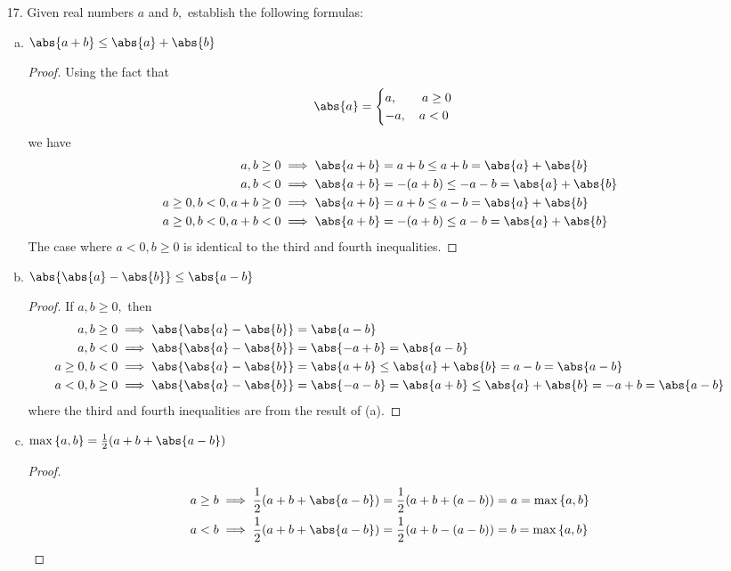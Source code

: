 \documentclass{article}
\begin{document}
\begin{itemize}
	\item[17.] Given real numbers $a$ and $b,$ establish the following formulas:
		\begin{enumerate}[(a)]
			\item $\abs{a+b}\le \abs{a}+\abs{b}$
				\begin{proof}
					Using the fact that
					\begin{align*}
						\abs{a}=\begin{cases}
							a,\quad\quad a\ge 0 \\
							-a,\quad a<0
						\end{cases}
					\end{align*}
					we have
					\begin{align*}
						a, b\ge0&\implies\abs{a+b}=a+b\le a+b = \abs{a}+\abs{b}\\
						a, b<0&\implies\abs{a+b}=-(a+b)\le -a-b = \abs{a}+\abs{b} \\
						a\ge 0, b<0, a+b\ge0&\implies\abs{a+b}=a+b\le a-b = \abs{a}+\abs{b} \\
						a\ge0, b<0, a+b<0&\implies\abs{a+b}=-(a+b)\le a - b = \abs{a} + \abs{b}
					\end{align*}
					The case where $a<0, b\ge 0$ is identical to the third and fourth inequalities.
				\end{proof}

			\item $\abs{\abs{a}-\abs{b}}\le\abs{a-b}$
				\begin{proof}
					If $a, b\ge 0,$ then
					\begin{align*}
						a, b\ge 0&\implies\abs{\abs{a}-\abs{b}}=\abs{a-b} \\
						a, b<0&\implies\abs{\abs{a}-\abs{b}}=\abs{-a+b}=\abs{a-b} \\
						a\ge 0, b<0&\implies\abs{\abs{a}-\abs{b}}=\abs{a+b}\le \abs{a}+\abs{b} = a - b = \abs{a-b} \\
						a<0, b\ge 0&\implies\abs{\abs{a}-\abs{b}}=\abs{-a-b}=\abs{a+b}\le\abs{a}+\abs{b} = -a+b = \abs{a-b}
					\end{align*}
					where the third and fourth inequalities are from the result of (a).
				\end{proof}

			\item $\max\left\{ a, b \right\} = \frac{1}{2}(a+b+\abs{a-b})$
				\begin{proof}
					\begin{align*}
						a\ge b&\implies\frac{1}{2}(a+b+\abs{a-b}) = \frac{1}{2}(a+b+(a-b)) = a = \max\left\{ a, b \right\} \\
						a<b&\implies\frac{1}{2}(a+b+\abs{a-b}) = \frac{1}{2}(a+b-(a-b)) = b = \max\left\{ a, b \right\}
					\end{align*}
				\end{proof}


\end{enumerate}
\end{itemize}
\end{document}
